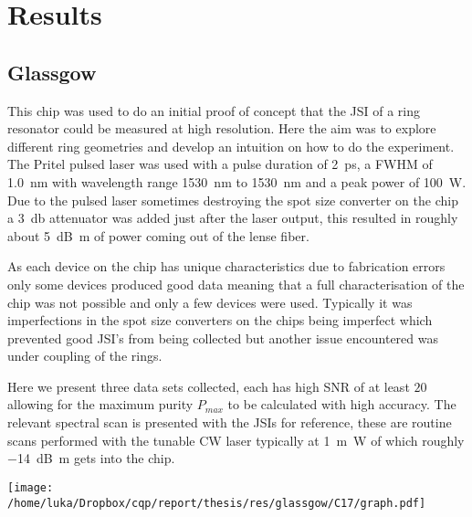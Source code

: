 \newpage
\section{Results}
\subsection{Glassgow}
This chip was used to do an initial proof of concept that the JSI of a ring resonator could be measured at high resolution. Here the aim was to explore different ring geometries and develop an intuition on how to do the experiment. The Pritel pulsed laser was used with a pulse duration of \SI{2}{\pico\second}, a FWHM of \SI{1.0}{\nano\meter} with wavelength range \SI{1530}{\nano\meter} to \SI{1530}{\nano\meter} and a peak power of \SI{100}{\watt}. Due to the pulsed laser sometimes destroying the spot size converter on the chip a \SI{3}{\decibel} attenuator was added just after the laser output, this resulted in roughly about \SI{5}{\deci\bel\m} of power coming out of the lense fiber.

As each device on the chip has unique characteristics due to fabrication errors only some devices produced good data meaning that a full characterisation of the chip was not possible and only a few devices were used. Typically it was imperfections in the spot size converters on the chips being imperfect which prevented good JSI's from being collected but another issue encountered was under coupling of the rings.

Here we present three data sets collected, each has high SNR of at least $20$ allowing for the maximum purity $P_{max}$ to be calculated with high accuracy. The relevant spectral scan is presented with the JSIs for reference, these are routine scans performed with the tunable CW laser typically at \SI{1}{\m\watt} of which roughly \SI{-14}{\deci\bel\m} gets into the chip. 

\begingroup
    \centering  
    \texttt{[image: /home/luka/Dropbox/cqp/report/thesis/res/glassgow/C17/graph.pdf]}
     \vspace{3pt} \label{c17_jsi}
\endgroup

